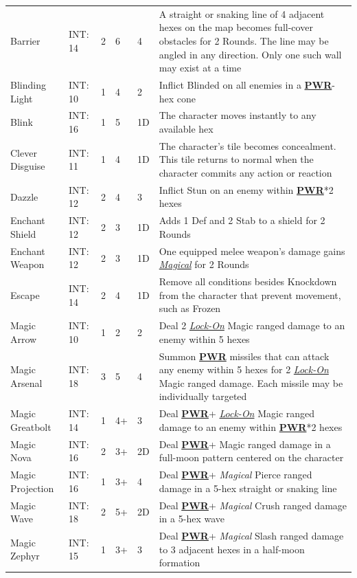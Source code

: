 \documentclass[12pt]{article}
\newcommand{\refto}[1]{\hyperlink{#1}{\textbf{#1}}}
\newcommand{\reftoit}[1]{\hyperlink{#1}{\emph{#1}}}
\begin{document}
\begin{center}
\begin{tabularx}{\textwidth}{p{}p{}p{}p{}p{}p{}}
Barrier & INT: 14 & 2 & 6 & 4 & A straight or snaking line of 4 adjacent hexes on the map becomes full-cover obstacles for 2 Rounds. The line may be angled in any direction. Only one such wall may exist at a time\\
Blinding Light & INT: 10 & 1 & 4 & 2 & Inflict Blinded on all enemies in a \refto{PWR}-hex cone\\
Blink & INT: 16 & 1 & 5 & 1D & The character moves instantly to any available hex \\
Clever Disguise & INT: 11 & 1 & 4 & 1D & The character’s tile becomes concealment. This tile returns to normal when the character commits any action or reaction\\
Dazzle & INT: 12 & 2 & 4 & 3 & Inflict Stun on an enemy within \refto{PWR}*2 hexes \\
Enchant Shield & INT: 12 & 2 & 3 & 1D & Adds 1 Def and 2 Stab to a shield for 2 Rounds \\
Enchant Weapon & INT: 12 & 2 & 3 & 1D & One equipped melee weapon’s damage gains \reftoit{Magical} for 2 Rounds \\
Escape & INT: 14 & 2 & 4 & 1D & Remove all conditions besides Knockdown from the character that prevent movement, such as Frozen \\
Magic Arrow & INT: 10 & 1 & 2 & 2 & Deal 2 \reftoit{Lock-On} Magic ranged damage to an enemy within 5 hexes\\
Magic Arsenal & INT: 18 & 3 & 5 & 4 & Summon \refto{PWR} missiles that can attack any enemy within 5 hexes for 2 \reftoit{Lock-On} Magic ranged damage. Each missile may be individually targeted \\
Magic Greatbolt & INT: 14 & 1 & 4+ & 3 & Deal \refto{PWR}+ \reftoit{Lock-On} Magic ranged damage to an enemy within \refto{PWR}*2 hexes\\
Magic Nova & INT: 16 & 2 & 3+ & 2D & Deal \refto{PWR}+ Magic ranged damage in a full-moon pattern centered on the character\\
Magic Projection & INT: 16 & 1 & 3+ & 4 & Deal \refto{PWR}+ \emph{Magical} Pierce ranged damage in a 5-hex straight or snaking line \\
Magic Wave & INT: 18 & 2 & 5+ & 2D & Deal \refto{PWR}+ \emph{Magical} Crush ranged damage in a 5-hex wave \\
Magic Zephyr & INT: 15 & 1 & 3+ & 3 & Deal \refto{PWR}+ \emph{Magical} Slash ranged damage to 3 adjacent hexes in a half-moon formation\\
\hline
\end{tabularx}
\end{center}
\end{document}
